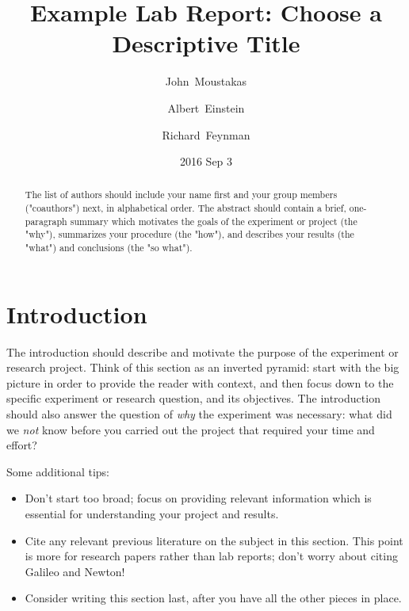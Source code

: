 \documentclass{revtex4}
\begin{document}
\title{Example Lab Report: Choose a Descriptive Title}

\author{John~Moustakas} 
\author{Albert~Einstein}
\author{Richard~Feynman}

\date{2016 Sep 3} %

\begin{abstract}
The list of authors should include your name first and your group members ("coauthors") next, in alphabetical order. The abstract should contain a brief, one-paragraph summary which motivates the goals of the experiment or project (the "why"), summarizes your procedure (the "how"), and describes your results (the "what") and conclusions (the "so what").
\end{abstract}

\maketitle

\section{Introduction}

The introduction should describe and motivate the purpose of the experiment or research project. Think of this section as an inverted pyramid: start with the big picture in order to provide the reader with context, and then focus down to the specific experiment or research question, and its objectives. The introduction should also answer the question of \emph{why} the experiment was necessary: what did we \emph{not} know before you carried out the project that required your time and effort?

Some additional tips:
\begin{itemize}
\item{Don't start too broad; focus on providing relevant information which is essential for understanding your project and results.}
\item{Cite any relevant previous literature on the subject in this section. This point is more for research papers rather than lab reports; don't worry about citing Galileo and Newton!}
\item{Consider writing this section last, after you have all the other pieces in place.}
\end{itemize}
\end{document}
